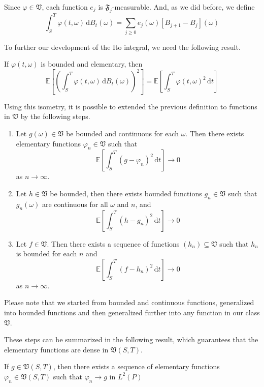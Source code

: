 Since $\varphi \in \mathfrak{V}$, each function $e_j$ is $\mathfrak{F}_j$-measurable. And, as we did before, we define
\[
	\int_S^T \varphi (t, \omega) \, \mathrm{d}B_t(\omega) = \sum_{j \geq 0} e_j(\omega) [B_{j+1} - B_j](\omega)
\]

To further our development of the Ito integral, we need the following result.

\begin{theorem}
	If $\varphi(t, \omega)$ is bounded and elementary, then
	\[
		\mathbb{E}\left[\left( \int_S^T \varphi(t,\omega) \, \mathrm{d}B_t(\omega) \right)^2 \right] = \mathbb{E} \left[\int_S^T \varphi(t,\omega)^2 \, \mathrm{d}t \right]
	\]
\end{theorem}

Using this isometry, it is possible to extended the previous definition to functions in $\mathfrak{V}$ by the following steps.

\begin{enumerate}
	\item Let $g(\omega) \in \mathfrak{V}$ be bounded and continuous for each $\omega$. Then there exists elementary functions $\varphi_n \in \mathfrak{V}$ such that
	\[
		\mathbb{E} \left[ \int_S^T (g-\varphi_n)^2 \, \mathrm{d}t \right] \longrightarrow 0
	\]
	as $n \to \infty$.
	\item Let $h \in \mathfrak{V}$ be bounded, then there exists bounded functions $g_n \in \mathfrak{V}$ such that $g_n (\omega)$ are continuous for all $\omega$ and $n$, and
	\[
		\mathbb{E} \left[ \int_S^T (h-g_n)^2 \, \mathrm{d}t \right] \longrightarrow 0
	\]
	\item Let $f \in \mathfrak{V}$. Then there exists a sequence of functions $(h_n) \subseteq \mathfrak{V}$ such that $h_n$ is bounded for each $n$ and 
	\[
		\mathbb{E} \left[ \int_S^T (f-h_n)^2 \, \mathrm{d}t \right] \longrightarrow 0
	\]
	as $n \to \infty$.
\end{enumerate}

Please note that we started from bounded and continuous functions, generalized into bounded functions and then generalized further into any function in our class $\mathfrak{V}$.

These steps can be summarized in the following result, which guarantees that the elementary functions are dense in $\mathfrak{V}(S,T)$.

\begin{theorem}
If $g\in \mathfrak{V}(S,T)$, then there exists a sequence of elementary functions $\varphi_n\in \mathfrak{V}(S,T)$ such that $\varphi_n\to g$ in $L^2(P)$
\end{theorem}

